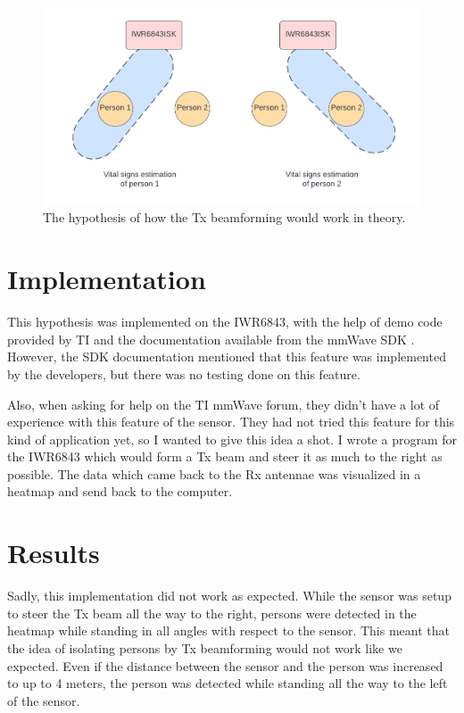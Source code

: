 \begin{figure}[t]
    \centering
    \includegraphics[width=.95\textwidth]{figures/appendix/tx_beamforming_theory.pdf}
    \caption{The hypothesis of how the Tx beamforming would work in theory.}
    \label{fig:tx_beam_theory}
\end{figure}

\section{Implementation}
This hypothesis was implemented on the IWR6843, with the help of demo code provided by TI and the documentation available from the mmWave SDK \cite{mmwavesdk_website}. However, the SDK documentation mentioned that this feature was implemented by the developers, but there was no testing done on this feature. 

Also, when asking for help on the TI mmWave forum, they didn't have a lot of experience with this feature of the sensor. They had not tried this feature for this kind of application yet, so I wanted to give this idea a shot. I wrote a program for the IWR6843 which would form a Tx beam and steer it as much to the right as possible. The data which came back to the Rx antennae was visualized in a heatmap and send back to the computer.

\section{Results}
Sadly, this implementation did not work as expected. While the sensor was setup to steer the Tx beam all the way to the right, persons were detected in the heatmap while standing in all angles with respect to the sensor. This meant that the idea of isolating persons by Tx beamforming would not work like we expected. Even if the distance between the sensor and the person was increased to up to 4 meters, the person was detected while standing all the way to the left of the sensor. 


